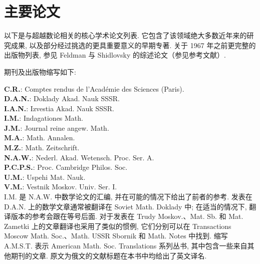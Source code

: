 \chapter*{主要论文}


以下是与超越数论相关的核心学术论文列表. 它包含了该领域绝大多数近年来的研究成果, 以及部分经过挑选的更具重要意义的早期专著. 关于 1967 年之前更完整的出版物列表, 参见 Feldman 与 Shidlovsky 的综述论文（参见参考文献）.

期刊及出版物缩写如下:

\noindent \textbf{C.R.}: Comptes rendus de l'Académie des Sciences (Paris).\\
\noindent \textbf{D.A.N.}: Doklady Akad. Nauk SSSR.\\
\noindent \textbf{I.A.N.}: Izvestia Akad. Nauk SSSR.\\
\noindent \textbf{I.M.}: Indagationes Math.\\
\noindent \textbf{J.M.}: Journal reine angew. Math.\\
\noindent \textbf{M.A.}: Math. Annalen.\\
\noindent \textbf{M.Z.}: Math. Zeitschrift.\\
\noindent \textbf{N.A.W.}: Nederl. Akad. Wetensch. Proc. Ser. A.\\
\noindent \textbf{P.C.P.S.}: Proc. Cambridge Philos. Soc.\\
\noindent \textbf{U.M.}: Uspehi Mat. Nauk.\\
\noindent \textbf{V.M.}: Vestnik Moskov. Univ. Ser. I.\\
I.M. 是 N.A.W. 中数学论文的汇编, 并在可能的情况下给出了前者的参考. 发表在 D.A.N. 上的数学文章通常被翻译在 Soviet Math. Doklady 中; 在适当的情况下, 翻译版本的参考会跟在等号后面. 对于发表在 Trudy Moskov.、Mat. Sb. 和 Mat. Zametki 上的文章翻译也采用了类似的惯例, 它们分别可以在 Transactions Moscow Math. Soc.、Math. USSR Sbornik 和 Math. Notes 中找到. 缩写 A.M.S.T. 表示 American Math. Soc. Translations 系列丛书, 其中包含一些来自其他期刊的文章. 原文为俄文的文献标题在本书中均给出了英文译名.



